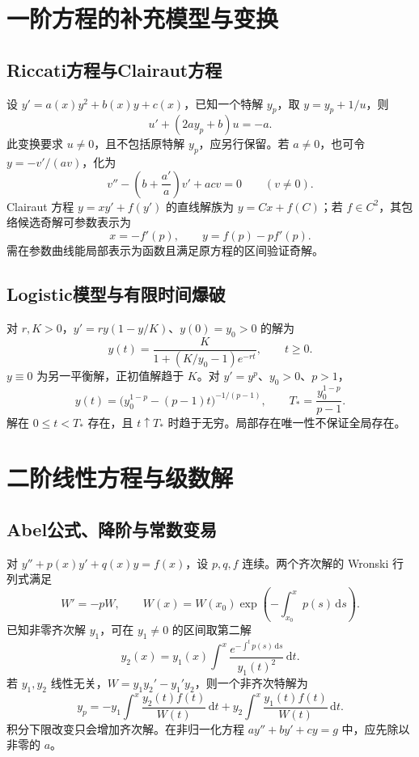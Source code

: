 \documentclass[../main.tex]{subfiles}
\begin{document}
\section{一阶方程的补充模型与变换}
\subsection{Riccati方程与Clairaut方程}
设 $y'=a(x)y^2+b(x)y+c(x)$，已知一个特解 $y_p$，取 $y=y_p+1/u$，则
\[
u'+(2ay_p+b)u=-a.
\]
此变换要求 $u\ne0$，且不包括原特解 $y_p$，应另行保留。若 $a\ne0$，也可令 $y=-v'/(av)$，化为
\[
v''-\left(b+\frac{a'}a\right)v'+acv=0\qquad(v\ne0).
\]
Clairaut 方程 $y=xy'+f(y')$ 的直线解族为 $y=Cx+f(C)$；若 $f\in C^2$，其包络候选奇解可参数表示为
\[
x=-f'(p),\qquad y=f(p)-pf'(p).
\]
需在参数曲线能局部表示为函数且满足原方程的区间验证奇解。

\subsection{Logistic模型与有限时间爆破}
对 $r,K>0$，$y'=ry(1-y/K)$、$y(0)=y_0>0$ 的解为
\[
y(t)=\frac K{1+(K/y_0-1)e^{-rt}},\qquad t\ge0.
\]
$y\equiv0$ 为另一平衡解，正初值解趋于 $K$。对 $y'=y^p$、$y_0>0$、$p>1$，
\[
y(t)=\bigl(y_0^{1-p}-(p-1)t\bigr)^{-1/(p-1)},\qquad
T_* =\frac{y_0^{1-p}}{p-1}.
\]
解在 $0\le t<T_*$ 存在，且 $t\uparrow T_*$ 时趋于无穷。局部存在唯一性不保证全局存在。

\section{二阶线性方程与级数解}
\subsection{Abel公式、降阶与常数变易}
对 $y''+p(x)y'+q(x)y=f(x)$，设 $p,q,f$ 连续。两个齐次解的 Wronski 行列式满足
\[
W'= -pW,\qquad W(x)=W(x_0)\exp\!\left(-\int_{x_0}^xp(s)\,\mathrm ds\right).
\]
已知非零齐次解 $y_1$，可在 $y_1\ne0$ 的区间取第二解
\[
y_2(x)=y_1(x)\int^x\frac{e^{-\int^t p(s)\,\mathrm ds}}{y_1(t)^2}\,\mathrm dt.
\]
若 $y_1,y_2$ 线性无关，$W=y_1y_2'-y_1'y_2$，则一个非齐次特解为
\[
y_p=-y_1\int^x\frac{y_2(t)f(t)}{W(t)}\,\mathrm dt
+y_2\int^x\frac{y_1(t)f(t)}{W(t)}\,\mathrm dt.
\]
积分下限改变只会增加齐次解。在非归一化方程 $ay''+by'+cy=g$ 中，应先除以非零的 $a$。
\end{document}
